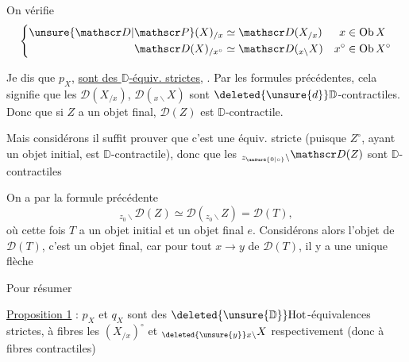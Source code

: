 On vérifie
\[
\left\{\begin{aligned}
\unsure{\mathscr D|\mathscr P}(X)_{/x}&\simeq\mathscr D(X_{/x}) & x&\in\mathrm{Ob}\,X\\
\mathscr D(X)_{/x^\circ}&\simeq\mathscr D({}_{x\backslash}X) & x^\circ&\in\mathrm{Ob}\,X^\circ
\end{aligned}\right.
\]

Je dis que $p_X$,  \uline{sont des $\mathbb D$-équiv. strictes},  . Par les formules précédentes,  cela signifie que les $\mathscr D(X_{/x})$, $\mathscr D({}_{x\backslash}X)$ sont $\deleted{\unsure{d}}\mathbb D$-contractiles. Donc que si $Z$ a un objet final, $\mathscr D(Z)$ est $\mathbb D$-contractile.

Mais considérons
il suffit   prouver que c'est une équiv. stricte (puisque $Z^\circ$, ayant un objet initial, est $\mathbb D$-contractile), donc que les $ {}_{z_{\unsure{0|\circ}}\backslash}\mathscr D(Z)$ sont $\mathbb D$-contractiles

On a par la formule précédente
\[
{}_{z_0\backslash}\mathscr D(Z)\simeq\mathscr D({}_{z_0\backslash}Z)=\mathscr D(T),
\]
où cette fois $T$ a un objet initial  et  un objet final $e$. Considérons alors l'objet
de $\mathscr D(T)$, c'est un objet final, car \deleted{\unsure{$\forall$}} pour tout $x\longrightarrow y$ de $\mathscr D(T)$, il y a une unique flèche

Pour résumer


\uline{Proposition 1} : $p_X$ et $q_X$ sont des $\deleted{\unsure{\mathbb D}}\mathrm{Hot}$-équivalences strictes, à fibres les $(X_{/x})^\circ$ et $ {}_{\deleted{\unsure{y}}x\backslash}X$ respectivement (donc à fibres contractiles)

